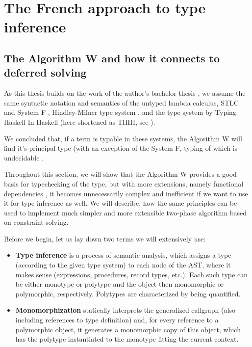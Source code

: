 \chapter{The French approach to type inference}

\label{chap1}

\section{The Algorithm W and how it connects to deferred solving}

As this thesis builds on the work of the author's bachelor thesis \cite{klepl2020type}, we assume the same syntactic notation and semantics of the untyped lambda calculus, STLC and System F \cite{barendregt1992lambda}, Hindley-Milner type system \cite{damas1982principal}, and the type system by Typing Haskell In Haskell (here shortened as THIH, see \cite{jones1999typing}).

We concluded that, if a term is typable in these systems, the Algorithm W will find it's principal type (with an exception of the System F, typing of which is undecidable \cite{wells1999typability}.

Throughout this section, we will show that the Algorithm W provides a good basis for typechecking of the type, but with more extensions, namely functional dependencies \cite{jones2000type}, it becomes unnecessarily complex and inefficient if we want to use it for type inference as well. We will describe, how the same principles can be used to implement much simpler and more extensible two-phase algorithm based on constraint solving.

Before we begin, let us lay down two terms we will extensively use:

\begin{itemize}
\item \textbf{Type inference} is a process of semantic analysis, which assigns a type (according to the given type system) to each node of the AST, where it makes sense (expressions, procedures, record types, etc.). Each such type can be either monotype or polytype and the object then monomorphic or polymorphic, respectively. Polytypes are characterized by being quantified.

\item \textbf{Monomorphization} statically interprets the generalized callgraph (also including references to type definition) and, for every reference to a polymorphic object, it generates a monomorphic copy of this object, which has the polytype instantiated to the monotype fitting the current context.
\end{itemize}

